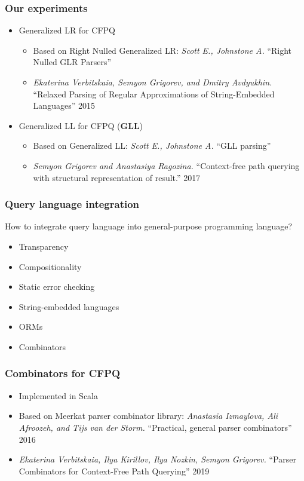 \documentclass[xcolor=table]{beamer}
\begin{document}
\begin{frame}[fragile] \frametitle{Our experiments}

\begin{itemize}
\item Generalized LR for CFPQ
\begin{itemize}
  \item Based on Right Nulled Generalized LR: \emph{Scott E., Johnstone A.} ``Right Nulled GLR Parsers''
  \item \emph{Ekaterina Verbitskaia, Semyon Grigorev, and Dmitry Avdyukhin.} ``Relaxed Parsing of Regular Approximations of String-Embedded Languages'' 2015
\end{itemize}

\pause

\item Generalized LL for CFPQ (\textbf{GLL})
\begin{itemize}
  \item Based on Generalized LL: \emph{Scott E., Johnstone A.} ``GLL parsing''
  \item \emph{Semyon Grigorev and Anastasiya Ragozina.} ``Context-free path querying with structural
  representation of result.'' 2017
\end{itemize}

\end{itemize}
\end{frame}

\begin{frame}[fragile] \frametitle{Query language integration}
How to integrate query language into general-purpose programming language?
\begin{itemize}
\item Transparency
\item Compositionality
\item Static error checking
\end{itemize}
\pause
\begin{itemize}
  \item String-embedded languages
  \item ORMs
  \item Combinators
\end{itemize}
\end{frame}

\begin{frame}[fragile] \frametitle{Combinators for CFPQ}
  \begin{itemize}
    \item Implemented in Scala
    \item Based on Meerkat parser combinator library: \emph{Anastasia Izmaylova, Ali Afroozeh, and Tijs van der Storm.} ``Practical, general parser combinators'' 2016
    \item \emph{Ekaterina Verbitskaia, Ilya Kirillov, Ilya Nozkin, Semyon Grigorev.} ``Parser Combinators for Context-Free Path Querying'' 2019
  \end{itemize}
\end{frame}
\end{document}
